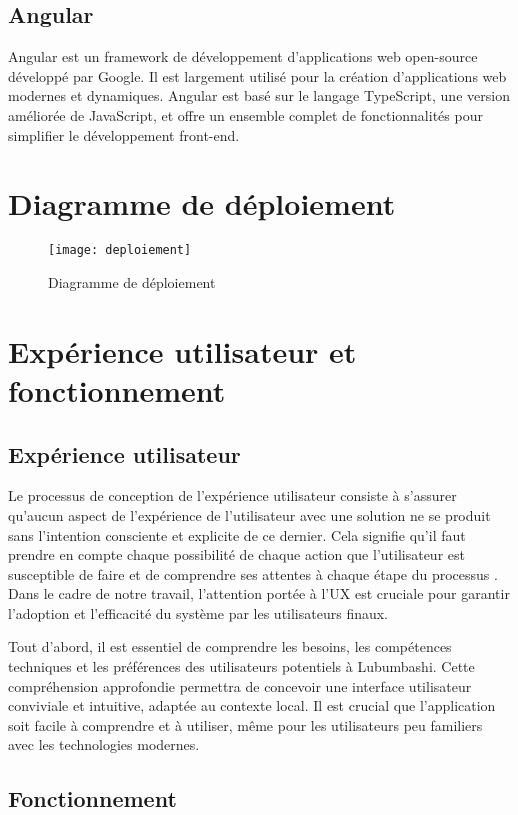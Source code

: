 \subsection{Angular}
Angular est un framework de développement d'applications web open-source développé par Google. Il est largement utilisé pour la création d'applications web modernes et dynamiques. Angular est basé sur le langage TypeScript, une version améliorée de JavaScript, et offre un ensemble complet de fonctionnalités pour simplifier le développement front-end.

\section{Diagramme de déploiement}
\begin{figure}[H]
	\centering
	\texttt{[image: deploiement]}
	\caption{Diagramme de déploiement}
\end{figure}

\section{Expérience utilisateur et fonctionnement}
\subsection{Expérience utilisateur}
Le processus de conception de l'expérience utilisateur consiste à s'assurer qu'aucun aspect de l'expérience de l'utilisateur avec une solution ne se produit sans l’intention consciente et explicite de ce dernier. Cela signifie qu'il faut prendre en compte chaque possibilité de chaque action que l'utilisateur est susceptible de faire et de comprendre ses attentes à chaque étape du processus \cite{jesse_james_garrett_elements}.\\

Dans le cadre de notre travail, l'attention portée à l'UX est cruciale pour garantir l'adoption et l'efficacité du système par les utilisateurs finaux.

Tout d'abord, il est essentiel de comprendre les besoins, les compétences techniques et les préférences des utilisateurs potentiels à Lubumbashi. Cette compréhension approfondie permettra de concevoir une interface utilisateur conviviale et intuitive, adaptée au contexte local. Il est crucial que l'application soit facile à comprendre et à utiliser, même pour les utilisateurs peu familiers avec les technologies modernes.

\subsection{Fonctionnement}

